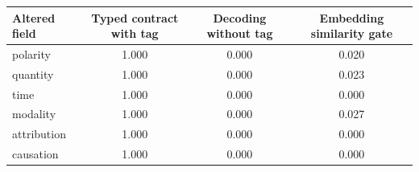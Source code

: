\begin{tabular}{@{}lccc@{}}
\toprule
Altered field & Typed contract with tag & Decoding without tag & Embedding similarity gate \\
\midrule
polarity & 1.000 & 0.000 & 0.020 \\
quantity & 1.000 & 0.000 & 0.023 \\
time & 1.000 & 0.000 & 0.000 \\
modality & 1.000 & 0.000 & 0.027 \\
attribution & 1.000 & 0.000 & 0.000 \\
causation & 1.000 & 0.000 & 0.000 \\
\bottomrule
\end{tabular}
